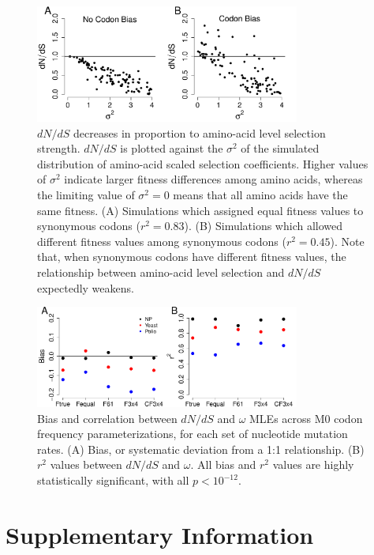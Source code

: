 \documentclass{pnastwo}
\begin{document}
\begin{figure}[htbp]
\centerline{\includegraphics[width=8.7cm]{figures/MainText/sd_vs_dnds.pdf}}
\caption{\label{stddev_dnds} $dN/dS$ decreases in proportion to amino-acid level selection strength. $dN/dS$ is plotted against the $\sigma^2 $ of the simulated distribution of amino-acid scaled selection coefficients. Higher values of $\sigma^2$ indicate larger fitness differences among amino acids, whereas the limiting value of $\sigma^2 = 0$ means that all amino acids have the same fitness. (A) Simulations which assigned equal fitness values to synonymous codons ($r^2=0.83$). (B) Simulations which allowed different fitness values among synonymous codons ($r^2=0.45$). Note that, when synonymous codons have different fitness values, the relationship between amino-acid level selection and $dN/dS$ expectedly weakens.}
\end{figure}

\bigskip
\bigskip
\bigskip
\bigskip

\begin{figure}[htbp]
\centerline{\includegraphics[width=8.7cm]{figures/MainText/nyp_bias_r2.pdf}}
\caption{\label{nyp_bias_r2} Bias and correlation between $dN/dS$ and $\omega$ MLEs across M0 codon frequency parameterizations, for each set of nucleotide mutation rates. (A) Bias, or systematic deviation from a 1:1 relationship. (B) $r^2$ values between $dN/dS$ and $\omega$. All bias and $r^2$ values are highly statistically significant, with all $p < 10^{-12}$.}
\end{figure}

\clearpage
\newpage

\section{Supplementary Information}
\end{document}
